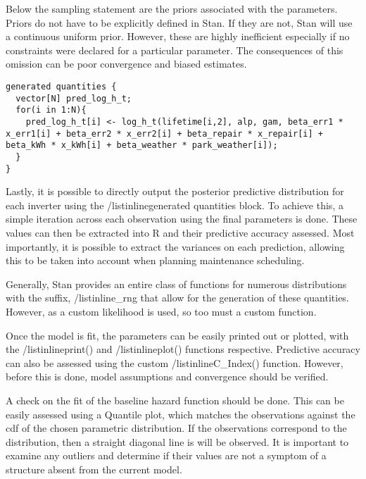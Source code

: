 Below the sampling statement are the priors associated with the parameters. Priors do not have to be explicitly defined in Stan. If they are not, Stan will use a continuous uniform prior. However, these are highly inefficient especially if no constraints were declared for a particular parameter. The consequences of this omission can be poor convergence and biased estimates. 



\begin{lstlisting}
generated quantities {
  vector[N] pred_log_h_t;
  for(i in 1:N){
    pred_log_h_t[i] <- log_h_t(lifetime[i,2], alp, gam, beta_err1 * x_err1[i] + beta_err2 * x_err2[i] + beta_repair * x_repair[i] + beta_kWh * x_kWh[i] + beta_weather * park_weather[i]);
  }
}
\end{lstlisting}

Lastly, it is possible to directly output the posterior predictive distribution for each inverter using the /listinline{generated quantities{}} block. To achieve this, a simple iteration across each observation using the final parameters is done. These values can then be extracted into R and their predictive accuracy assessed. Most importantly, it is possible to extract the variances on each prediction, allowing this to be taken into account when planning maintenance scheduling. 

Generally, Stan provides an entire class of functions for numerous distributions with the suffix, /listinline{\_rng} that allow for the generation of these quantities. However, as a custom likelihood is used, so too must a custom function.

Once the model is fit, the parameters can be easily printed out or plotted, with the /listinline{print()} and /listinline{plot()} functions respective. Predictive accuracy can also be assessed using the custom /listinline{C\_Index()} function. However, before this is done, model assumptions and convergence should be verified. 


A check on the fit of the baseline hazard function should be done. This can be easily assessed using a Quantile plot, which matches the observations against the cdf of the chosen parametric distribution. If the observations correspond to the distribution, then a straight diagonal line is will be observed. It is important to examine any outliers and determine if their values are not a symptom of a structure absent from the current model. 

